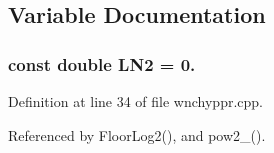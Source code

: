 \subsection{Variable Documentation}
\subsubsection[{L\-N2}]{\setlength{\rightskip}{0pt plus 5cm}const double L\-N2 = 0.\hspace{0.3cm}{\ttfamily [static]}}\label{toolboxes_2rnd_2wnchyppr_8cpp_aa4ae7c64775070011fae8d5610ae1a12}


Definition at line 34 of file wnchyppr.\-cpp.



Referenced by Floor\-Log2(), and pow2\-\_().

